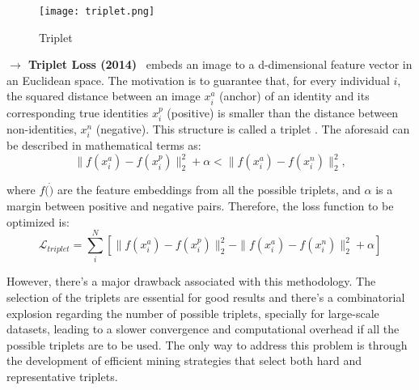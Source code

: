 \documentclass[class=report, crop=false, a4paper, 12pt]{standalone}
\begin{document}
\begin{figure}[!h]
    \centering
    \texttt{[image: triplet.png]}
    \caption{Triplet}
    \label{fig:triplet}
\end{figure}

\vspace{0.7\baselineskip}
\noindent\textbf{$\rightarrow$ Triplet Loss (2014)}~\autocite{schroffFaceNetUnifiedEmbedding2015} embeds an image to a d-dimensional feature vector in an Euclidean space. The motivation is to guarantee that, for every individual $i$, the squared distance between an image $x^{a}_{i}$ (anchor) of an identity and its corresponding true identities $x^{p}_{i}$ (positive) is smaller than the distance between non-identities, $x^{n}_{i}$ (negative). This structure is called a triplet . The aforesaid can be described in mathematical terms as:
\begin{equation}
\|f(x^{a}_{i})-f(x^{p}_{i})\|^{2}_{2} + \alpha < \|f(x^{a}_{i})-f(x^{n}_{i})\|^{2}_{2},
\end{equation}

\noindent where $f(\dot)$ are the feature embeddings from all the possible triplets, and $\alpha$ is a margin between positive and negative pairs. Therefore, the loss function to be optimized is:
\begin{equation}
\mathcal{L}_{triplet} = \sum_{i}^{N}\left[\|f(x^{a}_{i})-f(x^{p}_{i})\|^{2}_{2}-\|f(x^{a}_{i})-f(x^{n}_{i})\|^{2}_{2}+\alpha\right]
\end{equation}

However, there's a major drawback associated with this methodology. The selection of the triplets are essential for good results and there's a combinatorial explosion regarding the number of possible triplets, specially for large-scale datasets, leading to a slower convergence and computational overhead if all the possible triplets are to be used. The only way to address this problem is through the development of efficient mining strategies that select both hard and representative triplets.



\end{document}
